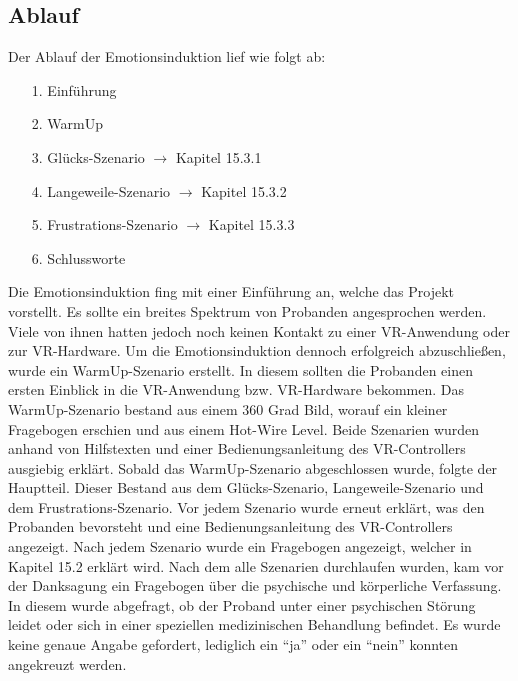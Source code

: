 \subsection{Ablauf} \label{ablauf-subsubsec}


Der Ablauf der Emotionsinduktion lief wie folgt ab:


\begin{itemize}
\item[1.] Einf{\"u}hrung
\item[2.] WarmUp
\item[3.] Gl{\"u}cks-Szenario $\rightarrow$ Kapitel 15.3.1
\item[4.] Langeweile-Szenario $\rightarrow$ Kapitel 15.3.2
\item[5.] Frustrations-Szenario $\rightarrow$ Kapitel 15.3.3
\item[6.] Schlussworte
\end{itemize}


Die Emotionsinduktion fing mit einer Einf{\"u}hrung an, welche das Projekt vorstellt.
Es sollte ein breites Spektrum von Probanden angesprochen werden. 
Viele von ihnen hatten jedoch noch keinen Kontakt zu einer VR-Anwendung oder zur VR-Hardware. 
Um die Emotionsinduktion dennoch erfolgreich abzuschlie{\ss}en, wurde ein WarmUp-Szenario erstellt. 
In diesem sollten die Probanden einen ersten Einblick in die VR-Anwendung bzw. VR-Hardware bekommen. 
Das WarmUp-Szenario bestand aus einem 360 Grad Bild, worauf ein kleiner Fragebogen erschien und aus einem Hot-Wire Level. 
Beide Szenarien wurden anhand von Hilfstexten und einer Bedienungsanleitung des VR-Controllers ausgiebig erkl{\"a}rt.
Sobald das WarmUp-Szenario abgeschlossen wurde, folgte der Hauptteil. 
Dieser Bestand aus dem Gl{\"u}cks-Szenario, Langeweile-Szenario und dem Frustrations-Szenario. 
Vor jedem Szenario wurde erneut erkl{\"a}rt, was den Probanden bevorsteht und eine Bedienungsanleitung des VR-Controllers angezeigt. 
Nach jedem Szenario wurde ein Fragebogen angezeigt, welcher in Kapitel 15.2 erkl{\"a}rt wird. 
Nach dem alle Szenarien durchlaufen wurden, kam vor der Danksagung ein Fragebogen {\"u}ber die psychische und k{\"o}rperliche Verfassung. 
In diesem wurde abgefragt, ob der Proband unter einer psychischen St{\"o}rung leidet oder sich in einer speziellen medizinischen Behandlung befindet. 
Es wurde keine genaue Angabe gefordert, lediglich ein ``ja'' oder ein ``nein'' konnten angekreuzt werden.
